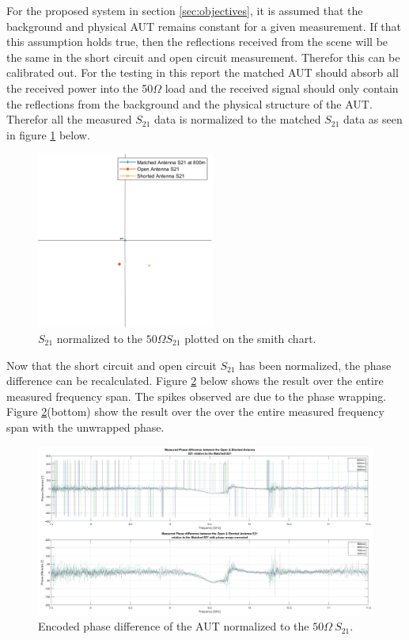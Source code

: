 For the proposed system in section \ref{sec:objectives}, it is assumed that the background and physical AUT remains constant for a given measurement. If that this assumption holds true, then the reflections received from the scene will be the same in the short circuit and open circuit measurement. Therefor this can be calibrated out. For the testing in this report the matched AUT should absorb all the received power into the 50$\Omega$ load and the received signal should only contain the reflections from the background and the physical structure of the AUT. Therefor all the measured \(S_{21}\) data is normalized to the matched \(S_{21}\) data as seen in figure \ref{fig:chp4_Calibrated_smith} below.

    \begin{figure}[H]
    \centering
    \includegraphics[width=0.4\linewidth]{Figures/chp4_Calibrated_smith.png}
    \caption{\(S_{21}\) normalized to the \(50\Omega S_{21}\) plotted on the smith chart.}
    \label{fig:chp4_Calibrated_smith}
    \end{figure}

Now that the short circuit and open circuit \(S_{21}\) has been normalized, the phase difference can be recalculated. Figure \ref{fig:chp4_Calibrated_difference_warpped_results} below shows the result over the entire measured frequency span. The spikes observed are due to the phase wrapping. Figure \ref{fig:chp4_Calibrated_difference_warpped_results}(bottom) show the result over the over the entire measured frequency span with the unwrapped phase.

    \begin{figure}[H]
    \centering
    \includegraphics[width=0.9\linewidth]{Figures/chp4_Calibrated_difference_warpped_results.png}
    \caption{Encoded phase difference of the AUT normalized to the \(50\Omega \ S_{21}\).}
    \label{fig:chp4_Calibrated_difference_warpped_results}
    \end{figure}

